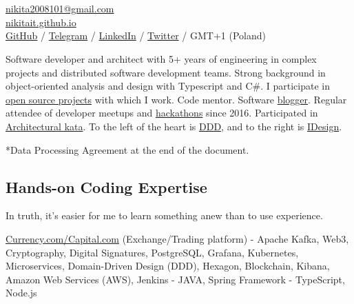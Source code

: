 \documentclass{yb}
\begin{document}
\ybPrintPhoto{}

\section*{\Large {}}

\href{mailto:nikita2008101@gmail.com}{nikita2008101@gmail.com}\\%
\href{https://nikitait.github.io/}{nikitait.github.io}\\%
\href{https://github.com/nikitait}{GitHub} /
\href{https://t.me/NonNikita}{Telegram} /
\href{https://www.linkedin.com/in/nikita-fedorov-041243126}{LinkedIn} /
\href{https://twitter.com/intent/follow?screen_name=Nikita_Fiodorov}{Twitter} / GMT+1 (Poland)
\vspace*{12pt}

Software developer and architect with
5+ years of engineering in complex projects and distributed software
development teams. Strong background in object-oriented analysis and design
with Typescript and C\#. I participate in \href{https://github.com/nikitait}{open source projects} with which I work. Code mentor. Software
\href{https://nikitait.github.io}{blogger}. Regular attendee of developer meetups and \href{https://www.youtube.com/watch?v=gVKDU043EWI&t=1s&ab_channel=EPAMSaint-Petersburg}{hackathons} since 2016. Participated in \href{
https://www.youtube.com/watch?v=Qu3g_eiY4XA&ab_channel=%
}{Architectural kata}. To the left of the heart is \href{https://github.com/ddd-crew}{DDD}, and to the right is \href{https://www.idesign.net/}{IDesign}.

*Data Processing Agreement at the end of the document.

\subsection*{Hands-on Coding Expertise}

In truth, it's easier for me to learn something anew than to use experience.



\href{https://currency.com/}{Currency.com/Capital.com} (Exchange/Trading platform)
\newline - Apache Kafka, Web3, Cryptography, Digital Signatures, PostgreSQL, Grafana, Kubernetes, Microservices, Domain-Driven Design (DDD), Hexagon, Blockchain, Kibana, Amazon Web Services (AWS), Jenkins
\newline - JAVA, Spring Framework
\newline - TypeScript, Node.js
\end{document}
